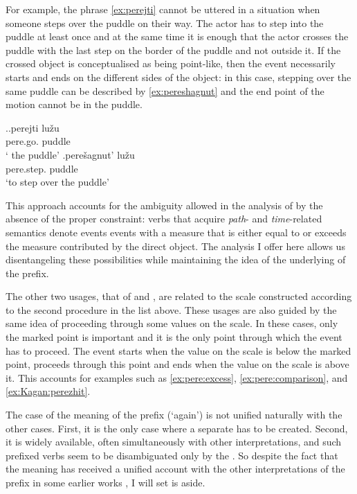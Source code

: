 For example, the phrase \ref{ex:perejti} cannot be uttered in a situation when someone steps over the puddle on their way. The actor has to step into the puddle at least once and at the same time it is enough that the actor crosses the puddle with the last step on the border of the puddle and not outside it. If the crossed object is conceptualised as being point-like, then the event necessarily starts and ends on the different sides of the object: in this case, stepping over the same puddle can be described by \ref{ex:pereshagnut} and the end point of the motion cannot be in the puddle.


\ex.\ag.\label{ex:perejti}perejti lu\v{z}u\\
pere.go. puddle\\
\trans ` the puddle'
\bg.\label{ex:pereshagnut}pere\v{s}agnut' lu\v{z}u\\
pere.step. puddle\\
\trans `to step over the puddle'

This approach accounts for the ambiguity allowed in the analysis of \citet{Kagan:book} by the absence of the proper  constraint: verbs that acquire \textit{path}- and \textit{time}-related semantics denote events events with a measure that is either equal to or exceeds the measure contributed by the direct object. The analysis I offer here allows us disentangeling these possibilities while maintaining the idea of the underlying  of the prefix.

The other two usages, that of  and , are related to the scale constructed according to the second procedure in the list above. These usages are also guided by the same idea of proceeding through some values on the scale. In these cases, only the marked point is important and it is the only point through which the event has to proceed. The event starts when the value on the scale is below the marked point, proceeds through this point and ends when the value on the scale is above it. This accounts for examples such as \ref{ex:pere:excess}, \ref{ex:pere:comparison}, and \ref{ex:Kagan:perezhit}.

The case of the  meaning of the prefix (`again') is not unified naturally with the other cases. First, it is the only case where a separate  has to be created. Second, it is widely available, often simultaneously with other interpretations, and such prefixed verbs seem to be disambiguated only by the . So despite the fact that the  meaning has received a unified account with the other interpretations of the prefix  in some earlier works \citep{Demjjanow:97, Kagan:book}, I will set is aside.

